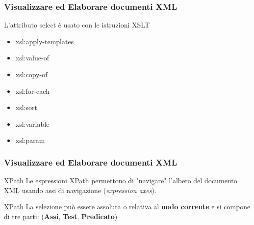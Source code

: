 \begin{frame}
    \frametitle{Visualizzare ed Elaborare documenti XML}
    \addtocounter{nframe}{1}
    

    \begin{block}{L’attributo select è usato con le istruzioni XSLT}
        \begin{itemize}
            \item xsl:apply-templates
            \item xsl:value-of
            \item xsl:copy-of
            \item xsl:for-each
            \item xsl:sort
            \item xsl:variable
            \item xsl:param
        \end{itemize}
    \end{block}

\end{frame}

\begin{frame}
    \frametitle{Visualizzare ed Elaborare documenti XML}
    \addtocounter{nframe}{1}
    

    \begin{block}{XPath}
        Le espressioni XPath permettono di "navigare" l'albero del documento XML usando assi di navigazione (\textit{expression axes}).
    \end{block}

    \begin{block}{XPath}
        La selezione può essere assoluta o relativa al \textbf{nodo corrente} e si compone di tre parti: (\textbf{Assi}, \textbf{Test}, \textbf{Predicato})
    \end{block}
    
\end{frame}

